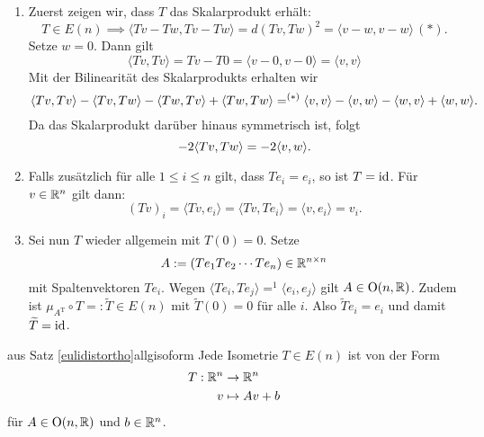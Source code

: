 \begin{beweis}
\begin{enumerate}
\item Zuerst zeigen wir, dass $T$ das Skalarprodukt erhält:
\begin{equation}
T \in E(n) \implies \langle Tv-Tw, Tv-Tw\rangle = d(Tv,Tw)^2 = \langle v-w, v-w \rangle \, (\ast).
\end{equation}
Setze $w = 0$. Dann gilt 
\begin{equation}
 \langle Tv, Tv \rangle = Tv-T0 = \langle v-0, v-0 \rangle = \langle v,v \rangle
\end{equation}
Mit der Bilinearität des Skalarprodukts erhalten wir
\begin{equation}
\langle Tv,Tv \rangle - \langle Tv,Tw \rangle - \langle Tw, Tv \rangle + \langle Tw, Tw \rangle =^{(\ast)} \ip{v,v} - \ip{v,w} - \ip{w,v} + \ip{w,w}.
\end{equation}
Da das Skalarprodukt darüber hinaus symmetrisch ist, folgt
\begin{equation}
-2 \ip{Tv,Tw} = -2 \ip{v,w}.
\end{equation}
\item Falls zusätzlich für alle $1 \leq i \leq n$ gilt, dass $Te_i = e_i$, so ist $T = \text{id}$. Für $v \in \mathbb{R}^n$ gilt dann:
\begin{equation}
(Tv)_i = \langle Tv, e_i \rangle =  \langle Tv, Te_i \rangle = \langle v, e_i \rangle = v_i.
\end{equation}
\item Sei nun $T$ wieder allgemein mit $T(0)=0$. Setze
\begin{equation}
A:=(Te_1 Te_2 \cdots Te_n) \in \mathbb{R}^{n \times n}
\end{equation}
mit Spaltenvektoren $Te_i$. Wegen $\langle Te_i, Te_j \rangle =^1 \langle e_i , e_j \rangle$ gilt $A \in \text{O}(n,\mathbb{R})$. Zudem ist $\mu_{A^\text{T}} \circ T =: \widetilde{T} \in E(n)$ mit $\widetilde{T}(0) = 0$ für alle $i$. Also $\widetilde{T}e_i = e_i$ und damit $\widetilde{T} = \text{id}$.
\end{enumerate}
\end{beweis}
\begin{korollar}{aus Satz \ref{eulidistortho}}{allgisoform}
Jede Isometrie $T \in E(n)$ ist von der Form
\begin{equation}
\begin{split}
T: \mathbb{R}^n &\to \mathbb{R}^n\\
v &\mapsto Av + b
\end{split}
\end{equation}
für $A \in \text{O}(n,\mathbb{R})$ und $b \in \mathbb{R}^n$.
\end{korollar}
